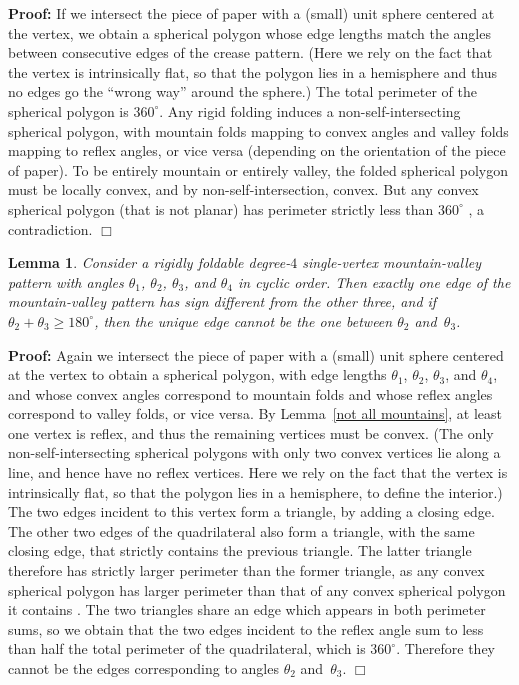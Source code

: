 \documentclass[11pt,letterpaper]{article}
\newtheorem{lemma}[theorem]{Lemma}
\newenvironment{proof}{\noindent\textbf{Proof: }\ignorespaces}
  {\hspace*{\fill}$\Box$\medskip}
\begin{document}
\begin{proof}
  If we intersect the piece of paper with a (small) unit sphere centered
  at the vertex, we obtain a spherical polygon whose edge lengths match the
  angles between consecutive edges of the crease pattern.
  (Here we rely on the fact that the vertex is intrinsically flat,
   so that the polygon lies in a hemisphere and thus no edges go
   the ``wrong way'' around the sphere.)
  The total perimeter of the spherical polygon is $360^\circ$.
  Any rigid folding induces a non-self-intersecting spherical polygon,
  with mountain folds mapping to convex angles and
  valley folds mapping to reflex angles, or vice versa
  (depending on the orientation of the piece of paper).
  To be entirely mountain or entirely valley,
  the folded spherical polygon must be locally convex,
  and by non-self-intersection, convex.
  But any convex spherical polygon (that is not planar) has perimeter
  strictly less than $360^\circ$ \cite[page~265, Theorem~IV]{Halsted-1885},
  a contradiction.
\end{proof}

\begin{lemma} \label{degree 4}
  Consider a rigidly foldable degree-$4$ single-vertex mountain-valley
  pattern with angles $\theta_1$, $\theta_2$, $\theta_3$, and $\theta_4$
  in cyclic order.
  Then exactly one edge of the mountain-valley pattern has sign different
  from the other three, and if $\theta_2 + \theta_3 \geq 180^\circ$,
  then the unique edge cannot be the one between $\theta_2$ and~$\theta_3$.
\end{lemma}

\begin{proof}
  Again we intersect the piece of paper with a (small) unit sphere centered
  at the vertex to obtain a spherical polygon, with edge lengths $\theta_1$,
  $\theta_2$, $\theta_3$, and $\theta_4$, and whose convex angles correspond
  to mountain folds and whose reflex angles correspond to valley folds,
  or vice versa.  By Lemma~\ref{not all mountains}, at least one vertex
  is reflex, and thus the remaining vertices must be convex.
  (The only non-self-intersecting spherical polygons with only two convex
   vertices lie along a line, and hence have no reflex vertices.
   Here we rely on the fact that the vertex is intrinsically flat,
   so that the polygon lies in a hemisphere, to define the interior.)
The two edges incident to this vertex form a triangle,
  by adding a closing edge.
  The other two edges of the quadrilateral also form a triangle,
  with the same closing edge, that strictly contains the previous triangle.
  The latter triangle therefore has strictly larger perimeter than the
  former triangle, as any convex spherical polygon has larger perimeter than
  that of any convex spherical polygon it contains
  \cite[page~264, Theorem~III]{Halsted-1885}.
  The two triangles share an edge which appears in both perimeter sums,
  so we obtain that the two edges incident to the reflex angle sum to less
  than half the total perimeter of the quadrilateral, which is $360^\circ$.
  Therefore they cannot be the edges corresponding to angles
  $\theta_2$ and~$\theta_3$.
\end{proof}
\end{document}
